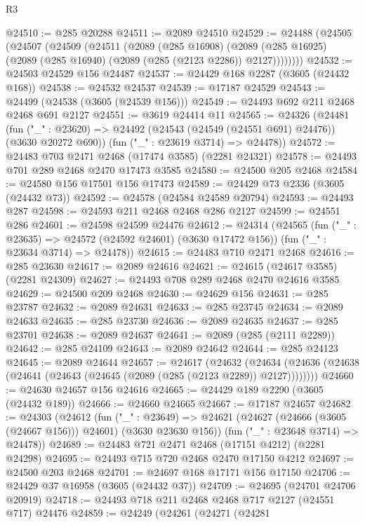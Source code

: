 \begin{lexlean}{R3}
\begin{coremodule}
@24510 := @285 @20288
@24511 := @2089 @24510
@24529 := @24488
    (@24505
      (@24507
        (@24509
          (@24511
            (@2089
              (@285 @16908)
              (@2089 (@285 @16925) (@2089 (@285 @16940) (@2089 (@285 (@2123 @2286)) @2127))))))))
@24532 := @24503 @24529 @156 @24487
@24537 := @24429 @168 @2287 (@3605 (@24432 @168))
@24538 := @24532 @24537
@24539 := @17187 @24529
@24543 := @24499 (@24538 (@3605 (@24539 @156)))
@24549 := @24493 @692 @211 @2468 @2468 @691 @2127
@24551 := @3619 @24414 @11
@24565 := @24326
    (@24481
      (fun ("_" : @23620) => @24492 (@24543 (@24549 (@24551 @691) @24476)) (@3630 @20272 @690))
      (fun ("_" : @23619 @3714) => @24478))
@24572 := @24483 @703 @2471 @2468 (@17474 @3585) (@2281 @24321)
@24578 := @24493 @701 @289 @2468 @2470 @17473 @3585
@24580 := @24500 @205 @2468
@24584 := @24580 @156 @17501 @156 @17473
@24589 := @24429 @73 @2336 (@3605 (@24432 @73))
@24592 := @24578 (@24584 @24589 @20794)
@24593 := @24493 @287
@24598 := @24593 @211 @2468 @2468 @286 @2127
@24599 := @24551 @286
@24601 := @24598 @24599 @24476
@24612 := @24314
    (@24565
      (fun ("_" : @23635) => @24572 (@24592 @24601) (@3630 @17472 @156))
      (fun ("_" : @23634 @3714) => @24478))
@24615 := @24483 @710 @2471 @2468
@24616 := @285 @23630
@24617 := @2089 @24616
@24621 := @24615 (@24617 @3585) (@2281 @24309)
@24627 := @24493 @708 @289 @2468 @2470 @24616 @3585
@24629 := @24500 @209 @2468
@24630 := @24629 @156
@24631 := @285 @23787
@24632 := @2089 @24631
@24633 := @285 @23745
@24634 := @2089 @24633
@24635 := @285 @23730
@24636 := @2089 @24635
@24637 := @285 @23701
@24638 := @2089 @24637
@24641 := @2089 (@285 (@2111 @2289))
@24642 := @285 @24109
@24643 := @2089 @24642
@24644 := @285 @24123
@24645 := @2089 @24644
@24657 := @24617
    (@24632
      (@24634 (@24636 (@24638 (@24641 (@24643 (@24645 (@2089 (@285 (@2123 @2289)) @2127))))))))
@24660 := @24630 @24657 @156 @24616
@24665 := @24429 @189 @2290 (@3605 (@24432 @189))
@24666 := @24660 @24665
@24667 := @17187 @24657
@24682 := @24303
    (@24612
      (fun ("_" : @23649) =>
      @24621 (@24627 (@24666 (@3605 (@24667 @156))) @24601) (@3630 @23630 @156))
      (fun ("_" : @23648 @3714) => @24478))
@24689 := @24483 @721 @2471 @2468 (@17151 @4212) (@2281 @24298)
@24695 := @24493 @715 @720 @2468 @2470 @17150 @4212
@24697 := @24500 @203 @2468
@24701 := @24697 @168 @17171 @156 @17150
@24706 := @24429 @37 @16958 (@3605 (@24432 @37))
@24709 := @24695 (@24701 @24706 @20919)
@24718 := @24493 @718 @211 @2468 @2468 @717 @2127 (@24551 @717) @24476
@24859 := @24249
    (@24261
      (@24271
        (@24281

\end{coremodule}
\end{lexlean}
